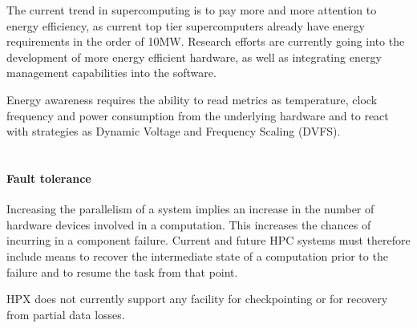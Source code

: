 The current trend in supercomputing is to pay more and more attention to energy efficiency, as current top tier supercomputers already have energy requirements in the order of 10MW. Research efforts are currently going into the development of more energy efficient hardware, as well as integrating energy management capabilities into the software\cite{surve2013energy}.

Energy awareness requires the ability to read metrics as temperature, clock frequency and power consumption from the underlying hardware and to react with strategies as Dynamic Voltage and Frequency Scaling (DVFS).
~\\~

\paragraph{Fault tolerance}
Increasing the parallelism of a system implies an increase in the number of hardware devices involved in a computation. This increases the chances of incurring in a component failure. Current and future HPC systems must therefore include means to recover the intermediate state of a computation prior to the failure and to resume the task from that point.

HPX does not currently support any facility for checkpointing or for recovery from partial data losses.

